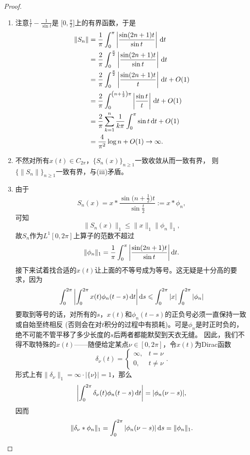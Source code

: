 \begin{proof}
\begin{enumerate}[label=(\roman*)]
\begin{align*}
    \end{align*}
    从而有
    \[\|S_n\|\geqslant\lim_{m\to\infty}\frac{\|S_n(x_m)\|_\infty}{\|x_m\|_\infty}
    \geqslant\lim_{m\to\infty}\frac{|S_n(x_m)(s)|}{\|x_m\|_\infty}=c_n.\]
    \item 注意$\frac{1}{t}-\frac{1}{\sin t}$是
    $\big[0,\frac{\pi}{2}\big]$上的有界函数，于是
    \begin{align*}
    \|S_n\|&=\frac{1}{\pi}\int_0^{\pi}\left|\frac{\sin(2n+1)t}{\sin t}\right|\,{\rm d}t\\
    &=\frac{2}{\pi}\int_0^{\frac{\pi}{2}}\left|\frac{\sin(2n+1)t}{\sin t}\right|\,{\rm d}t\\
    &=\frac{2}{\pi}\int_0^{\frac{\pi}{2}}\left|\frac{\sin(2n+1)t}{t}\right|\,{\rm d}t+O(1)\\
    &=\frac{2}{\pi}\int_0^{\left(n+\frac{1}{2}\right)\pi}\left|\frac{\sin t}{t}\right|\,{\rm d}t+O(1)\\
    &=\frac{2}{\pi}\sum_{k=1}^n\frac{1}{k\pi}\int_0^{\pi}\sin t\,{\rm d}t+O(1)\\
    &=\frac{4}{\pi^2}\log n+O(1)\to\infty.
    \end{align*}
    \item 不然对所有$x(t)\in C_{2\pi}$，$\{S_n(x)\}_{n\geqslant1}$一致收敛从而一致有界，
    则$\{\|S_n\|\}_{n\geqslant1}$一致有界，与(iii)矛盾。
    \item 由于
    \[S_n(x)=x*\frac{\sin\big(n+\frac{1}{2}\big)t}{\sin\frac{t}{2}}:=x*\phi_n,\]
    可知
    \[\|S_n(x)\|_1\leqslant\|x\|_1\|\phi_n\|_1,\]
    故$S_n$作为$L^1[0,2\pi]$上算子的范数不超过
    \[\|\phi_n\|_1=\frac{1}{\pi}\int_0^{\pi}\bigg|\frac{\sin(2n+1)t}{\sin t}\bigg|\,{\rm d}t.\]
    接下来试着找合适的$x(t)$让上面的不等号成为等号。这无疑是十分高的要求，因为
    \[\int_0^{2\pi}\left|\int_0^{2\pi} x(t)\phi_n(t-s)\,{\rm d}t\right|{\rm d}s
    \leqslant\int_0^{2\pi}|x|\int_0^{2\pi}|\phi_n|\]
    要取到等号的话，对所有的$s$，$x(t)$和$\phi_n(t-s)$的正负号必须一直保持一致或自始至终相反 
    (否则会在对$t$积分的过程中有损耗)。可是$\phi_n$是时正时负的，
    绝不可能不管平移了多少长度的$s$后两者都能默契到天衣无缝。
    因此，我们不得不取特殊的$x(t)$------随便给定某点$\nu\in[0,2\pi]$，令$x(t)$为Dirac函数
    \[\delta_\nu(t)=\begin{cases}\infty,&t=\nu\\0,&t\ne\nu\end{cases}.\]
    形式上有$\|\delta_\nu\|_1=\infty\cdot|\{\nu\}|=1$，那么
    \[\left|\int_0^{2\pi} \delta_\nu(t)\phi_n(t-s)\,{\rm d}t\right|=|\phi_n(\nu-s)|,\]
    因而
    \[\|\delta_\nu*\phi_n\|_1=\int_0^{2\pi}|\phi_n(\nu-s)|\,{\rm d}s=\|\phi_n\|_1.\]

\end{enumerate}
\end{proof}
